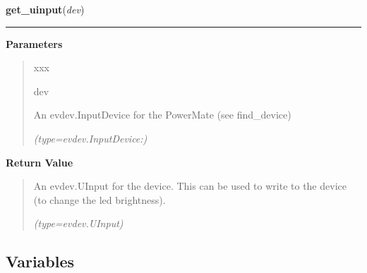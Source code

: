 \hspace{.8\funcindent}\begin{boxedminipage}{\funcwidth}

    \raggedright \textbf{get\_uinput}(\textit{dev})

    \vspace{-1.5ex}

    \rule{\textwidth}{0.5\fboxrule}
\setlength{\parskip}{2ex}
\setlength{\parskip}{1ex}
      \textbf{Parameters}
      \vspace{-1ex}

      \begin{quote}
        \begin{Ventry}{xxx}

          \item[dev]

          An evdev.InputDevice for the PowerMate (see find\_device)

            {\it (type=evdev.InputDevice:)}

        \end{Ventry}

      \end{quote}

      \textbf{Return Value}
    \vspace{-1ex}

      \begin{quote}
      An evdev.UInput for the device. This can be used to write to the 
      device (to change the led brightness).

      {\it (type=evdev.UInput)}

      \end{quote}

    \end{boxedminipage}



  \subsection{Variables}

